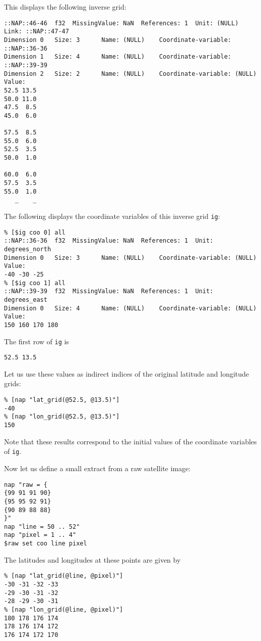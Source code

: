 This displays the following inverse grid:
  \begin{verbatim}
::NAP::46-46  f32  MissingValue: NaN  References: 1  Unit: (NULL)
Link: ::NAP::47-47
Dimension 0   Size: 3      Name: (NULL)    Coordinate-variable:
::NAP::36-36
Dimension 1   Size: 4      Name: (NULL)    Coordinate-variable:
::NAP::39-39
Dimension 2   Size: 2      Name: (NULL)    Coordinate-variable: (NULL)
Value:
52.5 13.5
50.0 11.0
47.5  8.5
45.0  6.0

57.5  8.5
55.0  6.0
52.5  3.5
50.0  1.0

60.0  6.0
57.5  3.5
55.0  1.0
   _    _
\end{verbatim}

The following displays the coordinate variables of this inverse
grid 
  \texttt{ig}:
  \begin{verbatim}
% [$ig coo 0] all
::NAP::36-36  f32  MissingValue: NaN  References: 1  Unit:
degrees_north
Dimension 0   Size: 3      Name: (NULL)    Coordinate-variable: (NULL)
Value:
-40 -30 -25
% [$ig coo 1] all
::NAP::39-39  f32  MissingValue: NaN  References: 1  Unit: degrees_east
Dimension 0   Size: 4      Name: (NULL)    Coordinate-variable: (NULL)
Value:
150 160 170 180
\end{verbatim}

The first row of 
  \texttt{ig} is
  \begin{verbatim}
52.5 13.5
\end{verbatim}

Let us use these values as indirect indices of the original
latitude and longitude grids:
  \begin{verbatim}
% [nap "lat_grid(@52.5, @13.5)"]
-40
% [nap "lon_grid(@52.5, @13.5)"]
150
\end{verbatim}

Note that these results correspond to the initial values of the
coordinate variables of 
  \texttt{ig}.
  \par Now let us define a small extract from a raw satellite image:
  \begin{verbatim}
nap "raw = {
{99 91 91 90}
{95 95 92 91}
{90 89 88 88}
}"
nap "line = 50 .. 52"
nap "pixel = 1 .. 4"
$raw set coo line pixel
\end{verbatim}

  \par The latitudes and longitudes at these points are given by
  \begin{verbatim}
% [nap "lat_grid(@line, @pixel)"]
-30 -31 -32 -33
-29 -30 -31 -32
-28 -29 -30 -31
% [nap "lon_grid(@line, @pixel)"]
180 178 176 174
178 176 174 172
176 174 172 170
\end{verbatim}

